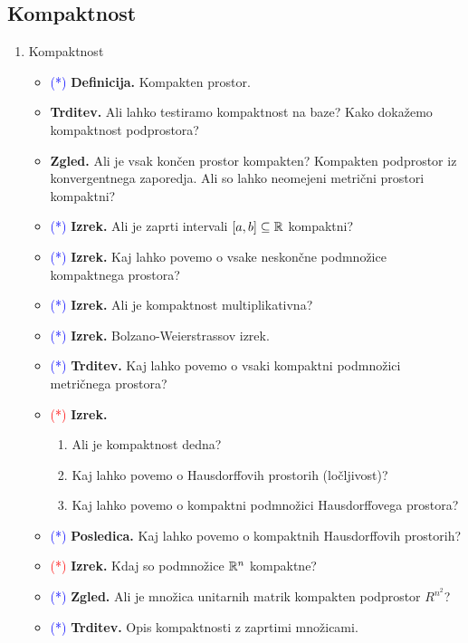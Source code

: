 \subsection{Kompaktnost}
\begin{enumerate}
    \item Kompaktnost
    \begin{itemize}
        \item \textcolor{blue}{(*)} \textbf{Definicija.} Kompakten prostor.
        \item \textbf{Trditev.} Ali lahko testiramo kompaktnost na baze? Kako dokažemo kompaktnost podprostora?
        \item \textbf{Zgled.} Ali je vsak končen prostor kompakten? Kompakten podprostor iz konvergentnega zaporedja. Ali so lahko neomejeni metrični prostori kompaktni?
        \item \textcolor{blue}{(*)} \textbf{Izrek.} Ali je zaprti intervali \([a, b] \subseteq \mathbb{R}\) kompaktni?
        \item \textcolor{blue}{(*)} \textbf{Izrek.} Kaj lahko povemo o vsake neskončne podmnožice kompaktnega prostora?
        \item \textcolor{blue}{(*)} \textbf{Izrek.} Ali je kompaktnost multiplikativna?
        \item \textcolor{blue}{(*)} \textbf{Izrek.} Bolzano-Weierstrassov izrek.
        \item \textcolor{blue}{(*)} \textbf{Trditev.} Kaj lahko povemo o vsaki kompaktni podmnožici metričnega prostora?
        \item \textcolor{red}{(*)} \textbf{Izrek.} 
        \begin{enumerate}
            \item Ali je kompaktnost dedna?
            \item Kaj lahko povemo o Hausdorffovih prostorih (ločljivost)?
            \item Kaj lahko povemo o kompaktni podmnožici Hausdorffovega prostora?
        \end{enumerate}
        \item \textcolor{blue}{(*)} \textbf{Posledica.} Kaj lahko povemo o kompaktnih Hausdorffovih prostorih?
        \item \textcolor{red}{(*)} \textbf{Izrek.} Kdaj so podmnožice \(\mathbb{R}^n\) kompaktne?
        \item \textcolor{blue}{(*)} \textbf{Zgled.} Ali je množica unitarnih matrik kompakten podprostor \(R^{n^2}\)?
        \item \textcolor{blue}{(*)} \textbf{Trditev.} Opis kompaktnosti z zaprtimi množicami.

\end{itemize}
\end{enumerate}
